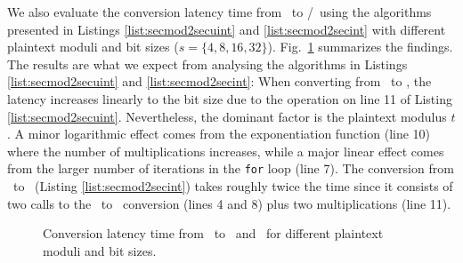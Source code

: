 We also evaluate the conversion latency time from \secmod\ to \secuint/\secint\ using the algorithms presented in Listings \ref{list:secmod2secuint} and \ref{list:secmod2secint} with different plaintext moduli and bit sizes ($s = \{4, 8, 16, 32\}$). Fig.~\ref{fig:fromsecmod} summarizes the findings.
The results are what we expect from analysing the algorithms in Listings \ref{list:secmod2secuint} and \ref{list:secmod2secint}: When converting from \secmod\ to \secuint, the latency increases linearly to the bit size due to the operation on line 11 of Listing \ref{list:secmod2secuint}. Nevertheless, the dominant factor is the plaintext modulus $t$. A minor logarithmic effect comes from the exponentiation function (line 10) where the number of multiplications increases, while a major linear effect comes from the larger number of iterations in the \texttt{for} loop (line 7).
The conversion from \secmod\ to \secint\ (Listing \ref{list:secmod2secint}) takes roughly twice the time since it consists of two calls to the \secmod\ to \secuint\ conversion (lines 4 and 8) plus two multiplications (line 11).

\begin{figure}[t]
	\centering
	\caption{Conversion latency time from \secmod\ to \secuint\ and \secint\ for different plaintext moduli and bit sizes.}
	\label{fig:fromsecmod}
	\vspace{-0.5cm}
\end{figure}



